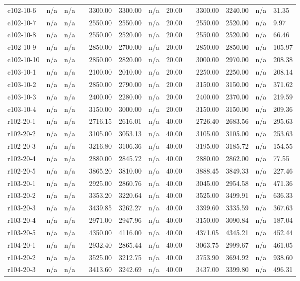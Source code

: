 \documentclass[final,5p,times,twocolumn]{elsarticle}
\begin{document}
{{{{{{{{{{{{{\begin{longtable}{l l l l l l l l l l l l l}
c102-10-6& n/a& n/a&&3300.00& 3300.00& n/a& 20.00&&3300.00& 3240.00& n/a& 31.35\\
c102-10-7& n/a& n/a&&2550.00& 2550.00& n/a& 20.00&&2550.00& 2520.00& n/a& 9.97\\
c102-10-8& n/a& n/a&&2550.00& 2520.00& n/a& 20.00&&2550.00& 2520.00& n/a& 66.46\\
c102-10-9& n/a& n/a&&2850.00& 2700.00& n/a& 20.00&&2850.00& 2850.00& n/a& 105.97\\
c102-10-10& n/a& n/a&&2850.00& 2820.00& n/a& 20.00&&3000.00& 2970.00& n/a& 208.38\\
c103-10-1& n/a& n/a&&2100.00& 2010.00& n/a& 20.00&&2250.00& 2250.00& n/a& 208.14\\
c103-10-2& n/a& n/a&&2850.00& 2790.00& n/a& 20.00&&3150.00& 3150.00& n/a& 371.62\\
c103-10-3& n/a& n/a&&2400.00& 2280.00& n/a& 20.00&&2400.00& 2370.00& n/a& 219.59\\
c103-10-4& n/a& n/a&&3150.00& 3000.00& n/a& 20.00&&3150.00& 3150.00& n/a& 209.36\\
r102-20-1& n/a& n/a&&2716.15& 2616.01& n/a& 40.00&&2726.40& 2683.56& n/a& 295.63\\
r102-20-2& n/a& n/a&&3105.00& 3053.13& n/a& 40.00&&3105.00& 3105.00& n/a& 253.63\\
r102-20-3& n/a& n/a&&3216.80& 3106.36& n/a& 40.00&&3195.00& 3185.72& n/a& 154.55\\
r102-20-4& n/a& n/a&&2880.00& 2845.72& n/a& 40.00&&2880.00& 2862.00& n/a& 77.55\\
r102-20-5& n/a& n/a&&3865.20& 3810.00& n/a& 40.00&&3888.45& 3849.33& n/a& 227.46\\
r103-20-1& n/a& n/a&&2925.00& 2860.76& n/a& 40.00&&3045.00& 2954.58& n/a& 471.36\\
r103-20-2& n/a& n/a&&3353.20& 3220.64& n/a& 40.00&&3525.00& 3499.91& n/a& 636.33\\
r103-20-3& n/a& n/a&&3439.85& 3262.27& n/a& 40.00&&3399.60& 3335.59& n/a& 367.63\\
r103-20-4& n/a& n/a&&2971.00& 2947.96& n/a& 40.00&&3150.00& 3090.84& n/a& 187.04\\
r103-20-5& n/a& n/a&&4350.00& 4116.00& n/a& 40.00&&4371.05& 4345.21& n/a& 452.44\\
r104-20-1& n/a& n/a&&2932.40& 2865.44& n/a& 40.00&&3063.75& 2999.67& n/a& 461.05\\
r104-20-2& n/a& n/a&&3525.00& 3212.75& n/a& 40.00&&3753.90& 3694.92& n/a& 938.60\\
r104-20-3& n/a& n/a&&3413.60& 3242.69& n/a& 40.00&&3437.00& 3399.80& n/a& 496.31\\

\end{longtable}}}}}}}}}}}}}}
\end{document}
